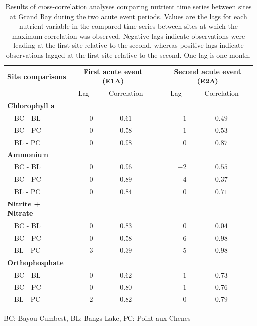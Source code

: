 \documentclass[letterpaper,12pt]{article}\usepackage[]{graphicx}\usepackage[]{color}
\begin{document}
\begin{table}[!tbp]
\caption{Results of cross-correlation analyses comparing nutrient time series between sites at Grand Bay during the two acute event periods.  Values are the lags for each nutrient variable in the compared time series between sites at which the maximum correlation was observed.  Negative lags indicate observations were leading at the first site relative to the second, whereas positive lags indicate observations lagged at the first site relative to the second.  One lag is one month.\label{tab:ccfnut}} 
\begin{center}
\begin{tabular}{lrccrc}
\hline\hline
\multicolumn{1}{l}{\bfseries Site comparisons}&\multicolumn{2}{c}{\bfseries First acute event (E1A)}&\multicolumn{1}{c}{\bfseries }&\multicolumn{2}{c}{\bfseries Second acute event (E2A)}\tabularnewline
\cline{2-3} \cline{5-6}
\multicolumn{1}{l}{}&\multicolumn{1}{c}{Lag}&\multicolumn{1}{c}{Correlation}&\multicolumn{1}{c}{}&\multicolumn{1}{c}{Lag}&\multicolumn{1}{c}{Correlation}\tabularnewline
\hline
{\bfseries Chlorophyll a}&&&&&\tabularnewline
~~BC - BL&$ 0$&$0.61$&&$-1$&$0.49$\tabularnewline
~~BC - PC&$ 0$&$0.58$&&$-1$&$0.53$\tabularnewline
~~BL - PC&$ 0$&$0.98$&&$ 0$&$0.87$\tabularnewline
\hline
{\bfseries Ammonium}&&&&&\tabularnewline
~~BC - BL&$ 0$&$0.96$&&$-2$&$0.55$\tabularnewline
~~BC - PC&$ 0$&$0.89$&&$-4$&$0.37$\tabularnewline
~~BL - PC&$ 0$&$0.84$&&$ 0$&$0.71$\tabularnewline
\hline
{\bfseries Nitrite + Nitrate}&&&&&\tabularnewline
~~BC - BL&$ 0$&$0.83$&&$ 0$&$0.04$\tabularnewline
~~BC - PC&$ 0$&$0.58$&&$ 6$&$0.98$\tabularnewline
~~BL - PC&$-3$&$0.39$&&$-5$&$0.98$\tabularnewline
\hline
{\bfseries Orthophosphate}&&&&&\tabularnewline
~~BC - BL&$ 0$&$0.62$&&$ 1$&$0.73$\tabularnewline
~~BC - PC&$ 0$&$0.80$&&$ 1$&$0.76$\tabularnewline
~~BL - PC&$-2$&$0.82$&&$ 0$&$0.79$\tabularnewline
\hline
\end{tabular}\end{center}

\footnotesize BC: Bayou Cumbest, BL: Bangs Lake, PC: Point aux Chenes\end{table}

\clearpage
\end{document}
